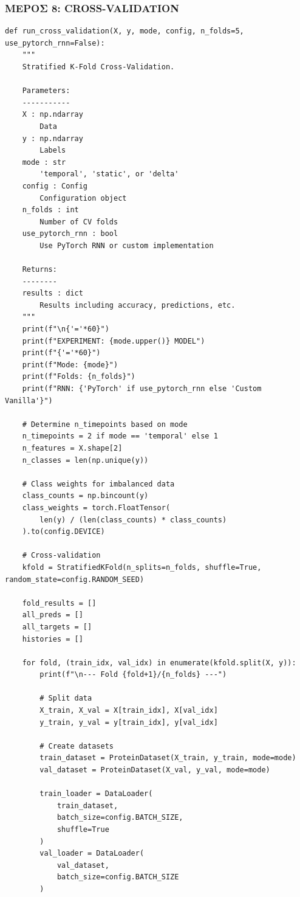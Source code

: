 \subsubsection*{ΜΕΡΟΣ 8: CROSS-VALIDATION}
 
\begin{lstlisting}
def run_cross_validation(X, y, mode, config, n_folds=5, use_pytorch_rnn=False):
    """
    Stratified K-Fold Cross-Validation.
 
    Parameters:
    -----------
    X : np.ndarray
        Data
    y : np.ndarray
        Labels
    mode : str
        'temporal', 'static', or 'delta'
    config : Config
        Configuration object
    n_folds : int
        Number of CV folds
    use_pytorch_rnn : bool
        Use PyTorch RNN or custom implementation
 
    Returns:
    --------
    results : dict
        Results including accuracy, predictions, etc.
    """
    print(f"\n{'='*60}")
    print(f"EXPERIMENT: {mode.upper()} MODEL")
    print(f"{'='*60}")
    print(f"Mode: {mode}")
    print(f"Folds: {n_folds}")
    print(f"RNN: {'PyTorch' if use_pytorch_rnn else 'Custom Vanilla'}")
 
    # Determine n_timepoints based on mode
    n_timepoints = 2 if mode == 'temporal' else 1
    n_features = X.shape[2]
    n_classes = len(np.unique(y))
 
    # Class weights for imbalanced data
    class_counts = np.bincount(y)
    class_weights = torch.FloatTensor(
        len(y) / (len(class_counts) * class_counts)
    ).to(config.DEVICE)
 
    # Cross-validation
    kfold = StratifiedKFold(n_splits=n_folds, shuffle=True, random_state=config.RANDOM_SEED)
 
    fold_results = []
    all_preds = []
    all_targets = []
    histories = []
 
    for fold, (train_idx, val_idx) in enumerate(kfold.split(X, y)):
        print(f"\n--- Fold {fold+1}/{n_folds} ---")
 
        # Split data
        X_train, X_val = X[train_idx], X[val_idx]
        y_train, y_val = y[train_idx], y[val_idx]
 
        # Create datasets
        train_dataset = ProteinDataset(X_train, y_train, mode=mode)
        val_dataset = ProteinDataset(X_val, y_val, mode=mode)
 
        train_loader = DataLoader(
            train_dataset,
            batch_size=config.BATCH_SIZE,
            shuffle=True
        )
        val_loader = DataLoader(
            val_dataset,
            batch_size=config.BATCH_SIZE
        )
 

\end{lstlisting}
